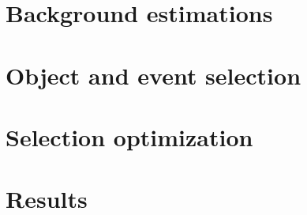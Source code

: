 %

\section{Background estimations}\label{sswwupgrade:background}


\section{Object and event selection}\label{sswwupgrade:object_event_selection}


\section{Selection optimization}\label{sswwupgrade:optimization}


\section{Results}\label{sswwupgrade:results}

